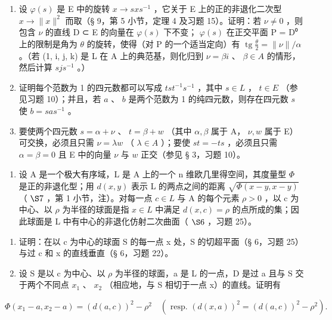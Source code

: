 \begin{enumerate}
\def\labelenumi{\alph{enumi})}
\item
  设 \(\varphi(s)\) 是 E 中的旋转 \(x \to sxs^{-1}\) ，它关于 E 上的正的非退化二次型 \(x \to \|x\|^2\) 而取（§ 9，第 5 小节，定理 4 及习题 15）。证明：若 \(\nu \neq 0\) ，则包含 \(\nu\) 的直线 D ⊂ E 的向量在 \(\varphi(s)\) 下不变； \(\varphi(s)\) 在正交平面 P = D⁰ 上的限制是角为 \(\theta\) 的旋转，使得（对 P 的一个适当定向）有 \(\operatorname{tg} \frac{\theta}{2} = \| \nu \| / \alpha\) 。（若 (1, i, j, k) 是 L 在 A 上的典范基，则化归到 \(\nu = \beta i\) 、 \(\beta \in A\) 的情形，然后计算 \(sjs^{-1}\) 。）
\item
  证明每个范数为 1 的四元数都可以写成 \(tst^{-1}s^{-1}\) ，其中 \(s \in L\) ， \(t \in E\) （参见习题 10）；并且，若 \(a\) 、 \(b\) 是两个范数为 1 的纯四元数，则存在四元数 \(s\) 使 \(b = sas^{-1}\) 。
\item
  要使两个四元数 \(s = \alpha + \nu\) 、 \(t = \beta + w\) （其中 \(\alpha, \beta\) 属于 A， \(\nu, w\) 属于 E）可交换，必须且只需 \(\nu = \lambda w\) （ \(\lambda \in A\) ）；要使 \(st = -ts\) ，必须且只需 \(\alpha = \beta = 0\) 且 E 中的向量 \(\nu\) 与 \(w\) 正交（参见 § 3，习题 10）。
\end{enumerate}

\begin{enumerate}
\def\labelenumi{\arabic{enumi})}
\setcounter{enumi}{11}
\tightlist
\item
  设 A 是一个极大有序域，L 是 A 上的一个 n 维欧几里得空间，其度量型 \(\Phi\) 是正的非退化型；用 \(d(x, y)\) 表示 L 的两点之间的距离 \(\sqrt{\Phi(x - y, x - y)}\) （ \(\S 7\) ，第 1 小节，注）。对每一点 \(c \in L\) 与 A 的每个元素 \(\rho > 0\) ，以 c 为中心、以 \(\rho\) 为半径的球面是指 \(x \in L\) 中满足 \(d(x, c) = \rho\) 的点所成的集；因此球面是 L 中有中心的非退化仿射二次曲面（ \(\S 6\) ，习题 25）。
\end{enumerate}

\begin{enumerate}
\def\labelenumi{\alph{enumi})}
\item
  证明：在以 c 为中心的球面 S 的每一点 x 处，S 的切超平面（§ 6，习题 25）与过 c 和 x 的直线垂直（§ 6，习题 22）。
\item
  设 S 是以 c 为中心、以 \(\rho\) 为半径的球面，a 是 L 的一点，D 是过 a 且与 S 交于两个不同点 \(x_{1}\) 、 \(x_{2}\) （相应地，与 S 相切于一点 x）的直线。证明有
\end{enumerate}

\[
\Phi (x _ {1} - a, x _ {2} - a) = (d (a, c)) ^ {2} - \rho^ {2} \quad (\text { resp. } (d (x, a)) ^ {2} = (d (a, c)) ^ {2} - \rho^ {2}).
\]


